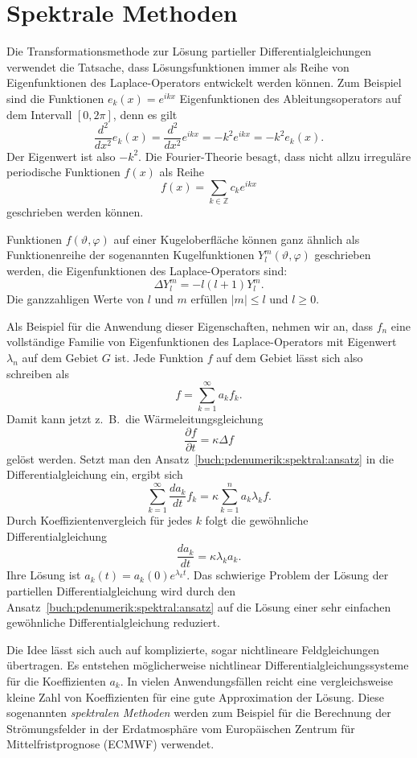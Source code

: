 %
%
\section{Spektrale Methoden
\label{buch:pdenumerik:section:spektral}}
Die Transformationsmethode zur Lösung partieller Differentialgleichungen
verwendet die Tatsache, dass Lösungsfunktionen immer als Reihe von
Eigenfunktionen des Laplace-Operators entwickelt werden können.
Zum Beispiel sind die Funktionen
\(
e_k(x) = e^{ikx}
\)
Eigenfunktionen des Ableitungsoperators auf dem Intervall $[0,2\pi]$,
denn es gilt
\[
\frac{d^2}{dx^2} e_k(x)
=
\frac{d^2}{dx^2} e^{ikx}
=
-k^2 e^{ikx}
=
-k^2 e_k(x).
\]
Der Eigenwert ist also $-k^2$.
Die Fourier-Theorie besagt, dass nicht allzu irreguläre periodische
Funktionen $f(x)$ als Reihe
\[
f(x)
=
\sum_{k\in\mathbb{Z}} c_ke^{ikx}
\]
geschrieben werden können.

Funktionen $f(\vartheta,\varphi)$ auf einer Kugeloberfläche können
ganz ähnlich als Funktionenreihe der sogenannten Kugelfunktionen
$Y^m_l(\vartheta,\varphi)$ geschrieben werden, die Eigenfunktionen
des Laplace-Operators sind:
\[
\Delta Y^m_l
=
-l(l+1) Y^m_l.
\]
Die ganzzahligen Werte von $l$ und $m$ erfüllen $|m|\le l$ und $l\ge 0$.

Als Beispiel für die Anwendung dieser Eigenschaften, nehmen wir an,
dass $f_n$ eine vollständige Familie von Eigenfunktionen des Laplace-Operators
mit Eigenwert $\lambda_n$ auf dem Gebiet $G$ ist. 
Jede Funktion $f$ auf dem Gebiet lässt sich also schreiben als
\begin{equation}
f = \sum_{k=1}^\infty a_k f_k.
\label{buch:pdenumerik:spektral:ansatz}
\end{equation}
Damit kann jetzt z.~B.~die Wärmeleitungsgleichung
\[
\frac{\partial f}{\partial t}
=
\kappa
\Delta f
\]
gelöst werden.
Setzt man den Ansatz~\eqref{buch:pdenumerik:spektral:ansatz} in die 
Differentialgleichung ein, ergibt sich
\[
\sum_{k=1}^\infty
\frac{d a_k}{d t}
f_k
=
\kappa \sum_{k=1}^n a_k \lambda_k f.
\]
Durch Koeffizientenvergleich für jedes $k$ folgt die gewöhnliche
Differentialgleichung
\[
\frac{d a_k}{d t}
=
\kappa \lambda_k a_k.
\]
Ihre Lösung ist $a_k(t) = a_k(0) e^{\lambda_kt}$.
Das schwierige Problem der Lösung der partiellen Differentialgleichung
wird durch den Ansatz~\eqref{buch:pdenumerik:spektral:ansatz} auf die
Lösung einer sehr einfachen gewöhnliche Differentialgleichung reduziert.

Die Idee lässt sich auch auf komplizierte, sogar nichtlineare
Feldgleichungen übertragen.
Es entstehen möglicherweise nichtlinear Differentialgleichungssysteme
für die Koeffizienten $a_k$.
In vielen Anwendungsfällen reicht eine vergleichsweise kleine Zahl
von Koeffizienten für eine gute Approximation der Lösung.
Diese sogenannten \emph{spektralen Methoden}
%
werden zum Beispiel für die Berechnung der Strömungsfelder in der 
Erdatmosphäre vom Europäischen Zentrum für Mittelfristprognose
(ECMWF) verwendet.

